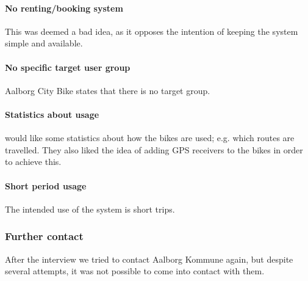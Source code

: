 \paragraph{No renting/booking system}
This was deemed a bad idea, as it opposes the intention of keeping the system simple and available.

\paragraph{No specific target user group}
Aalborg City Bike states that there is no target group.

\paragraph{Statistics about usage}
\citybike would like some statistics about how the bikes are used; e.g. which routes are travelled.
They also liked the idea of adding GPS receivers to the bikes in order to achieve this.

\paragraph{Short period usage}
The intended use of the system is short trips.

\subsubsection{Further contact}
After the interview we tried to contact Aalborg Kommune again, but despite several attempts, it was not possible to come into contact with them.
